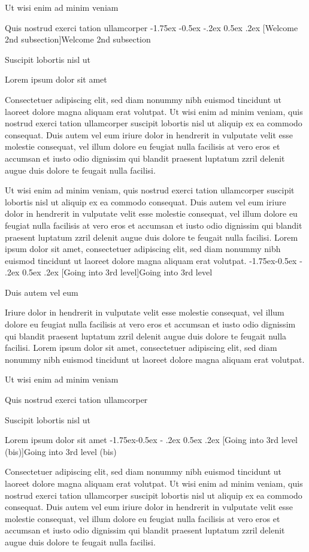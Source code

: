 \documentclass[11pt,twoside]{article}\makeatletter
\makeatletter
\renewcommand\section{\@startsection {section}{1}{\z@}%
     {-1.75ex \@plus -0.5ex \@minus -.2ex}%
     {0.5ex \@plus .2ex}%
     {\reset@font\Large\bfseries\sffamily}}
\renewcommand\subsection{\@startsection{subsection}{2}{\z@}%
     {-1.75ex\@plus -0.5ex \@minus- .2ex}%
     {0.5ex \@plus .2ex}%
     {\reset@font\Large\sffamily}}
\renewcommand\subsubsection{\@startsection{subsubsection}{3}{\z@}%
     {-1.5ex\@plus -0.35ex \@minus -.2ex}%
     {0.5ex \@plus .2ex}%
     {\reset@font\large\sffamily}}
\def\DivII{\subsection}
\def\DivIII{\subsubsection}
\def\DivII{\section}
\def\DivIII{\subsection}
\makeatother
\begin{document}
Ut wisi enim ad minim veniam\par
Quis nostrud exerci tation ullamcorper 
\DivII[Welcome 2nd subsection]{Welcome 2nd subsection}\par
Suscipit lobortis nisl ut \par
Lorem ipsum dolor sit amet\par
Consectetuer adipiscing elit, sed diam nonummy nibh euismod 	tincidunt ut laoreet dolore magna aliquam erat volutpat. Ut wisi enim 	ad minim veniam, quis nostrud exerci tation ullamcorper suscipit 	lobortis nisl ut aliquip ex ea commodo consequat. Duis autem vel eum 	iriure dolor in hendrerit in vulputate velit esse molestie consequat, 	vel illum dolore eu feugiat nulla facilisis at vero eros et accumsan 	et iusto odio dignissim qui blandit praesent luptatum zzril delenit       augue duis dolore te feugait nulla facilisi.\par
Ut wisi enim ad minim veniam, quis nostrud exerci tation       ullamcorper suscipit lobortis nisl ut aliquip ex ea commodo       consequat. Duis autem vel eum iriure dolor in hendrerit in vulputate       velit esse molestie consequat, vel illum dolore eu feugiat nulla       facilisis at vero eros et accumsan et iusto odio dignissim qui blandit       praesent luptatum zzril delenit augue duis dolore te feugait nulla       facilisi. Lorem ipsum dolor sit amet, consectetuer adipiscing elit,       sed diam nonummy nibh euismod tincidunt ut laoreet dolore magna       aliquam erat volutpat. 
\DivIII[Going into 3rd level]{Going into 3rd level}\par
Duis autem vel eum \par
Iriure dolor in hendrerit in vulputate velit esse molestie       consequat, vel illum dolore eu feugiat nulla facilisis at vero eros et       accumsan et iusto odio dignissim qui blandit praesent luptatum zzril       delenit augue duis dolore te feugait nulla facilisi. Lorem ipsum dolor       sit amet, consectetuer adipiscing elit, sed diam nonummy nibh euismod       tincidunt ut laoreet dolore magna aliquam erat volutpat. \par
Ut wisi enim ad minim veniam\par
Quis nostrud exerci tation ullamcorper \par
Suscipit lobortis nisl ut \par
Lorem ipsum dolor sit amet
\DivIII[Going into 3rd level (bis)]{Going into 3rd level (bis)}\par
Consectetuer adipiscing elit, sed diam nonummy nibh euismod       tincidunt ut laoreet dolore magna aliquam erat volutpat. Ut wisi enim       ad minim veniam, quis nostrud exerci tation ullamcorper suscipit       lobortis nisl ut aliquip ex ea commodo consequat. Duis autem vel eum       iriure dolor in hendrerit in vulputate velit esse molestie consequat,       vel illum dolore eu feugiat nulla facilisis at vero eros et accumsan       et iusto odio dignissim qui blandit praesent luptatum zzril delenit       augue duis dolore te feugait nulla facilisi.\par
\end{document}
